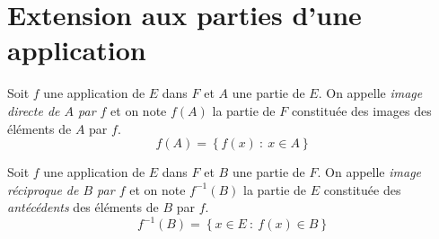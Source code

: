 \documentclass[a4paper,12pt,french]{book}
\begin{document}
\section{Extension aux parties d'une application}

\begin{definition}
Soit $f$ une application de $E$ dans $F$ et $A$ une partie de $E$. On appelle \textit{image directe de $A$ par $f$} et on note $f(A)$ la partie de $F$ constituée des images des éléments de $A$ par $f$.
$$f(A)=\left\{f(x)\::\:x\in A\right\}$$
\end{definition}
\begin{exemple}[]
\end{exemple}

\begin{definition}
Soit $f$ une application de $E$ dans $F$ et $B$ une partie de $F$. On appelle \textit{image réciproque de $B$ par $f$} et on note $f^{-1}(B)$ la partie de $E$ constituée des \textit{antécédents} des éléments de $B$ par $f$.
$$f^{-1}(B)=\left\{x\in E\::\:f(x)\in B\right\}$$
\end{definition}
\begin{exemple}[]
\end{exemple}
\end{document}
